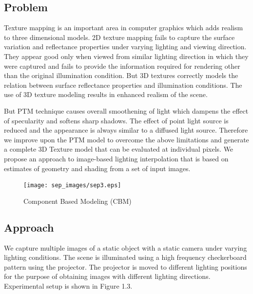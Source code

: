 \subsection{Problem}
Texture mapping is an important area in computer graphics which adds realism to three dimensional 
models. 2D texture mapping fails to capture the surface variation and reflectance properties under
varying lighting and viewing direction. They appear good only when viewed from similar lighting
direction in which they were captured and fails to provide the information required for rendering other than the original
illumination condition. But 3D textures correctly models the relation between surface reflectance
properties and illumination conditions. The use of 3D texture modeling
results in enhanced realism of the scene.

But PTM technique causes overall smoothening of light which dampens the effect
of specularity and softens sharp shadows. The effect of point light source is
reduced and the appearance is always similar to a diffused light source.
Therefore we improve upon the PTM model 
to overcome the above limitations
and generate a complete 3D Texture model that can be evaluated at individual
pixels. We propose an approach to image-based lighting interpolation that is
based on estimates of geometry and shading from a set of input images.


\begin{figure}[t]
\centering
\texttt{[image: sep\_images/sep3.eps]}

\caption{Component Based Modeling (CBM)}
\label{fig:CBM}
\end{figure}

\subsection{Approach}
We capture multiple images of a static object with a static camera under varying
lighting conditions.
The scene is
illuminated using a high frequency checkerboard pattern using the projector. The
projector is moved to different lighting positions for the purpose of obtaining
images with different lighting directions. Experimental setup is shown in Figure 1.3.

